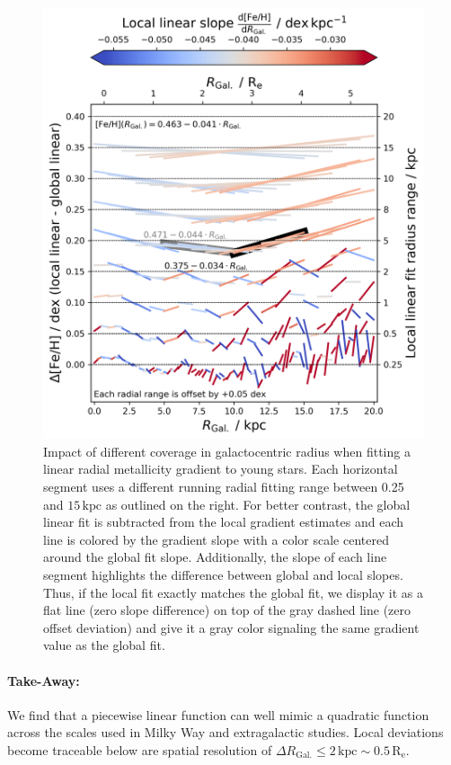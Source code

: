 \documentclass[fleqn,usenatbib]{mnras}
\begin{document}
\begin{figure}
    \centering
    \includegraphics[width=\columnwidth]{figures/radial_range_impact.png}
    \caption{Impact of different coverage in galactocentric radius when fitting a linear radial metallicity gradient to young stars. Each horizontal segment uses a different running radial fitting range between 0.25 and $15\,\mathrm{kpc}$ as outlined on the right. For better contrast, the global linear fit is subtracted from the local gradient estimates and each line is colored by the gradient slope with a color scale centered around the global fit slope. Additionally, the slope of each line segment highlights the difference between global and local slopes. Thus, if the local fit exactly matches the global fit, we display it as a flat line (zero slope difference) on top of the gray dashed line (zero offset deviation) and give it a gray color signaling the same gradient value as the global fit.}
    \label{fig:radial_range_impact}
\end{figure}

\paragraph*{Take-Away:} We find that a piecewise linear function can well mimic a quadratic function across the scales used in Milky Way and extragalactic studies. Local deviations become traceable below are spatial resolution of $\Delta R_\mathrm{Gal.} \leq 2\,\mathrm{kpc} \sim 0.5\,\mathrm{R_e}$.
\end{document}
